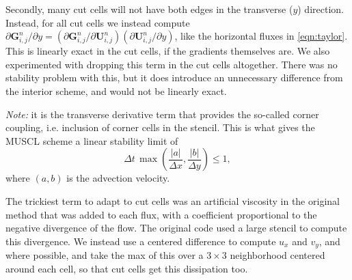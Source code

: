Secondly, many cut cells will not have both edges in the
transverse ($y$) direction. Instead, for all cut cells we
instead compute
$ \partial \mathbf{G}_{i,j}^n / \partial y = ( \partial \mathbf{G}_{i,j}^n / \partial \mathbf{U}_{i,j}^n)( \partial \mathbf{U}_{i,j}^n / \partial y)$,
like the horizontal fluxes in \eqref{eqn:taylor}. This is linearly exact in the cut cells, 
if the gradients themselves are.
We also experimented with dropping this term in the cut cells
altogether. There was no stability problem with this, but it
does introduce an unnecessary difference from
the interior scheme, and would not be linearly exact.

\textit{Note:} it is the transverse derivative term that provides the so-called corner 
coupling, i.e. inclusion
of corner cells in the stencil. This is what  gives  the MUSCL scheme a linear stability limit of
\begin{equation}
\label{eqn:bigcfllimit}
\Delta t \, \max \left (\frac{|a|}{\Delta x} , \frac{|b|}{\Delta y} \right) \leq 1,
\end{equation}
where $(a,b)$ is the advection velocity.  

The trickiest term to adapt to cut cells was an artificial viscosity in the original method that was 
added to each flux, with a
coefficient proportional to the negative divergence of the flow.  The original
code used a large stencil to compute this divergence. We instead use a centered
difference to compute $u_x$ and $v_y$, and where possible, and  
take the max of this over a $3 \times  3$
neighborhood centered around each cell, so that cut cells get this dissipation too. 


